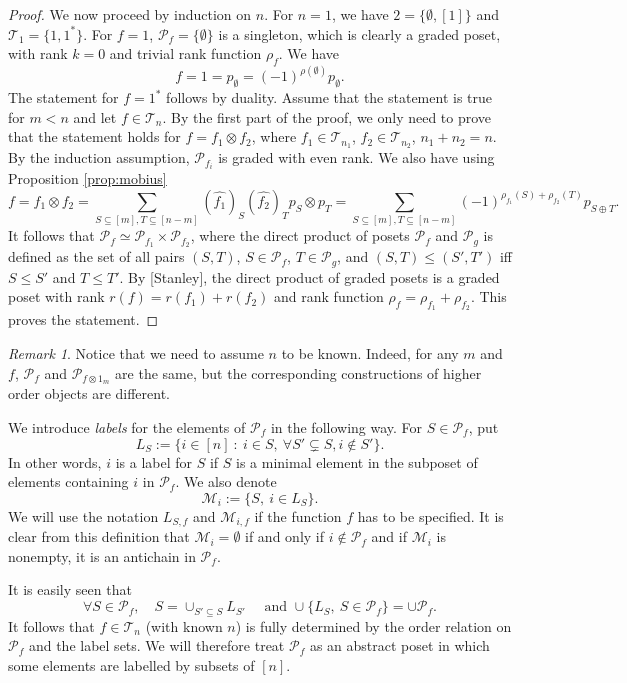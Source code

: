 \documentclass[12pt]{article}
\theoremstyle{definition}
\theoremstyle{remark}
\newtheorem{remark}{Remark}
\def\Me{\mathcal M}
\def\Te{\mathcal T}
\def\Pe{\mathcal P}
\begin{document}
\begin{proof}
We now proceed by induction on $n$. For $n=1$, we have $2=\{\emptyset, [1]\}$ and
$\Te_1=\{1,1^*\}$. For $f=1$, $\mathcal P_f=\{\emptyset\}$ is a singleton, which 
is clearly a graded poset, with rank $k=0$ and trivial rank function $\rho_f$.  We have
\[
f = 1=p_\emptyset=(-1)^{\rho(\emptyset)}p_\emptyset.
\]
The statement for $f=1^*$ follows by duality. Assume that the statement is true for $m<n$ and let $f\in \Te_n$.
 By the first part of the proof,  we only need to prove
that the statement holds for $f=f_1\otimes f_2$, where $f_1\in \Te_{n_1}$, $f_2\in
\Te_{n_2}$, $n_1+n_2=n$.  By the induction
assumption, $\Pe_{f_i}$ is graded with even rank. We also
have using Proposition \ref{prop:mobius}
\[
f=f_1\otimes f_2=\sum_{S\subseteq [m], T\subseteq [n-m]} (\widehat {f_1})_S(\widehat
{f_2})_T p_S\otimes p_T=
\sum_{S\subseteq [m], T\subseteq [n-m]}(-1)^{\rho_{f_1}(S)+\rho_{f_2}(T)}p_{S\oplus T}.
\]
It follows that $\Pe_f\simeq \Pe_{f_1}\times \Pe_{f_2}$, where the direct product of posets $\Pe_f$ and
$\Pe_g$ is defined as the set of all pairs $(S,T)$, $S\in \Pe_f$, $T\in \Pe_g$, and
$(S,T)\le (S',T')$ iff $S\le S'$ and $T\le T'$.
By [Stanley], the direct product of graded posets 
is a graded poset with rank $r(f)=r(f_1)+r(f_2)$ and rank function
$\rho_f=\rho_{f_1}+\rho_{f_2}$.  This
proves the statement. 

\end{proof}

\begin{remark}\label{remark:n} Notice that we need to assume $n$ to be known. Indeed, for any $m$ and
$f$, $\Pe_f$ and $\Pe_{f\otimes 1_m}$ are the same, but the  corresponding constructions of higher order
objects are different.

\end{remark}


We  introduce {\em labels} for the elements of $\Pe_f$ in the following way. 
 For  $S\in \Pe_f$, put
\[
L_S:=\{i\in [n]\ : \ i\in S,\ \forall S'\subsetneq S, i\notin S'\}.
\]
In other words, $i$ is a label for $S$ if $S$ is a minimal element in the subposet of
elements containing $i$ in  $\Pe_f$. 
We also denote
\[
\Me_i:=\{S,\ i\in L_S\}.
\]
We will use the notation $L_{S,f}$ and $\Me_{i,f}$ if the function $f$ has to be
specified. It is clear from this definition that $\Me_i=\emptyset$ if and only if $i\notin
\Pe_f$ and  if $\Me_i$ is nonempty, it is an antichain in
$\Pe_f$.   


It is easily seen that 
\[
\forall S\in \Pe_f,\quad S=\cup_{S'\subseteq S} L_{S'}\quad \text{ and }\cup\{L_S, \ S\in
\Pe_f\}=\cup \Pe_f.
\]
It follows that $f\in \Te_n$ (with known $n$) is fully determined by the order relation on $\Pe_f$ and the
label sets. We will therefore treat $\Pe_f$ as an abstract poset in which some elements
are labelled by subsets of $[n]$. 
\end{document}
